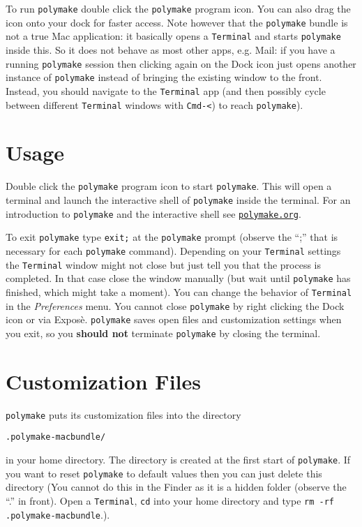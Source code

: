 \documentclass[a4paper]{amsart}
\newcommand{\polymake}{\texttt{polymake}\xspace}
\begin{document}
To run \polymake double click the \polymake program icon. You can
also drag the icon onto your dock for faster access. Note however that
the \polymake bundle is not a true Mac application: it basically
opens a \texttt{Terminal} and starts \polymake inside this. So it does not
behave as most other apps, e.g. Mail: if you have a running \polymake
session then clicking again on the Dock icon just opens another
instance of \polymake instead of bringing the existing window to the
front. Instead, you should navigate to the \texttt{Terminal} app (and then
possibly cycle between different \texttt{Terminal} windows with \texttt{Cmd-<})
to reach \polymake).

\section*{Usage}

Double click the \polymake program icon to start \polymake. This will
open a terminal and launch the interactive shell of \polymake inside
the terminal. For an introduction to \polymake and the interactive
shell see \href{http://polymake.org}{\tt polymake.org}\;.

To exit \polymake type \texttt{exit;} at the \polymake prompt
(observe the ``;'' that is necessary for each \polymake
command). Depending on your \texttt{Terminal} settings the
\texttt{Terminal} window might not close but just tell you that the
process is completed. In that case close the window manually (but wait
until \polymake has finished, which might take a moment). You can
change the behavior of \texttt{Terminal} in the \textit{Preferences}
menu.  You cannot close \polymake by right clicking the Dock icon or
via Expos\`e. \polymake saves open files and customization settings
when you exit, so you \textbf{should not} terminate \polymake by
closing the terminal.

\section*{Customization Files}

\polymake puts its customization files into the directory 

\smallskip
\texttt{.polymake-macbundle/} 
\smallskip

in your home directory. The directory is created at the first start of
\polymake. If you want to reset \polymake to default values then you
can just delete this directory (You cannot do this in the Finder as it
is a hidden folder (observe the ``.'' in front). Open a \texttt{Terminal},
\texttt{cd} into your home directory and type \texttt{rm -rf
  .polymake-macbundle}.).
\end{document}
